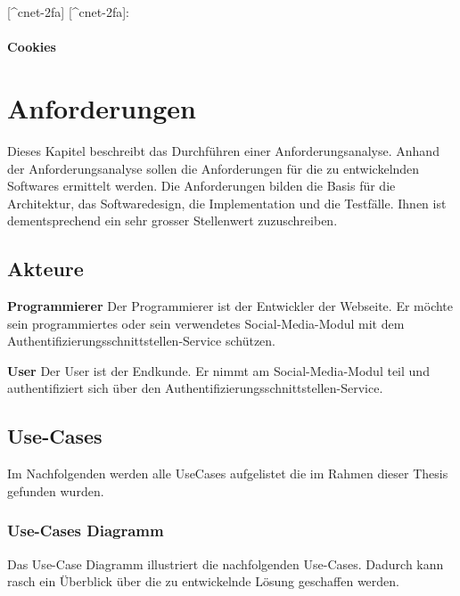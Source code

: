 {[}\^{}cnet-2fa{]} {[}\^{}cnet-2fa{]}: \autocite{cnet-2fa}

\subsubsection{Cookies}\label{cookies}

\chapter{Anforderungen}\label{anforderungen}

Dieses Kapitel beschreibt das Durchführen einer Anforderungsanalyse.
Anhand der Anforderungsanalyse sollen die Anforderungen für die zu
entwickelnden Softwares ermittelt werden. Die Anforderungen bilden die
Basis für die Architektur, das Softwaredesign, die Implementation und
die Testfälle. Ihnen ist dementsprechend ein sehr grosser Stellenwert
zuzuschreiben.

\section{Akteure}\label{akteure}

\textbf{Programmierer} Der Programmierer ist der Entwickler der
Webseite. Er möchte sein programmiertes oder sein verwendetes
Social-Media-Modul mit dem Authentifizierungsschnittstellen-Service
schützen.

\textbf{User} Der User ist der Endkunde. Er nimmt am Social-Media-Modul
teil und authentifiziert sich über den
Authentifizierungsschnittstellen-Service.

\newpage

\section{Use-Cases}\label{use-cases}

Im Nachfolgenden werden alle UseCases aufgelistet die im Rahmen dieser
Thesis gefunden wurden.

\subsection{Use-Cases Diagramm}\label{use-cases-diagramm}

Das Use-Case Diagramm illustriert die nachfolgenden Use-Cases. Dadurch
kann rasch ein Überblick über die zu entwickelnde Lösung geschaffen
werden.

